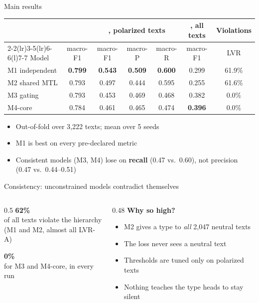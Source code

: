\begin{frame}{Main results}
\centering\small
\begin{tabular}{@{}lcccccc@{}}
\toprule
& \DET{} & \multicolumn{3}{c}{\TYPE{}, polarized texts} & \TYPE{}, all texts & Violations \\
\cmidrule(lr){2-2}\cmidrule(lr){3-5}\cmidrule(lr){6-6}\cmidrule(l){7-7}
Model & macro-F1 & macro-F1 & macro-P & macro-R & macro-F1 & LVR \\
\midrule
M1 independent & \textbf{0.799} & \textbf{0.543} & \textbf{0.509} & \textbf{0.600} & 0.299 & 61.9\% \\
M2 shared MTL  & 0.793 & 0.497 & 0.444 & 0.595 & 0.255 & 61.6\% \\
M3 gating      & 0.793 & 0.453 & 0.469 & 0.468 & 0.382 & 0.0\% \\
M4-core        & 0.784 & 0.461 & 0.465 & 0.474 & \textbf{0.396} & 0.0\% \\
\bottomrule
\end{tabular}

\vspace{8pt}
\begin{itemize}\small
\item Out-of-fold over 3{,}222 texts; mean over 5 seeds
\item M1 is best on every pre-declared metric
\item Consistent models (M3, M4) lose on \TYPE{} \textbf{recall} (0.47 vs.\ 0.60),
      not precision (0.47 vs.\ 0.44--0.51)
\end{itemize}
\end{frame}

\begin{frame}{Consistency: unconstrained models contradict themselves}
\begin{columns}[c]
\begin{column}{0.5\textwidth}
\centering
{\Huge \textbf{62\%}}\\[2pt]
of all texts violate the hierarchy\\(M1 and M2, almost all LVR-A)

\vspace{12pt}
{\Huge \textbf{0\%}}\\[2pt]
for M3 and M4-core, in every run
\end{column}
\begin{column}{0.48\textwidth}
\textbf{Why so high?}
\begin{itemize}\small
\item M2 gives a type to \emph{all} 2{,}047 neutral texts
\item The \TYPE{} loss never sees a neutral text
\item Thresholds are tuned only on polarized texts
\item Nothing teaches the type heads to stay silent
\end{itemize}
\end{column}
\end{columns}
\end{frame}

